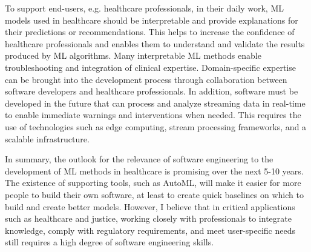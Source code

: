 \documentclass[11pt,runningheads]{article}
\begin{document}
To support end-users, e.g. healthcare professionals, in their daily work, ML models used in healthcare should be interpretable and provide explanations for their predictions or recommendations. 
This helps to increase the confidence of healthcare professionals and enables them to understand and validate the results produced by ML algorithms. Many interpretable ML methods enable troubleshooting and integration of clinical expertise. Domain-specific expertise can be brought into the development process through collaboration between software developers and healthcare professionals. 
In addition, software must be developed in the future that can process and analyze streaming data in real-time to enable immediate warnings and interventions when needed. This requires the use of technologies such as edge computing, stream processing frameworks, and a scalable infrastructure.

In summary, the outlook for the relevance of software engineering to the development of ML methods in healthcare is promising over the next 5-10 years. 
The existence of supporting tools, such as AutoML, will make it easier for more people to build their own software, at least to create quick baselines on which to build and
create better models. However, I believe that in critical applications such as healthcare and justice, working closely with professionals to integrate knowledge, comply with regulatory requirements, and meet user-specific needs still requires a high degree of software engineering skills. 

\newpage
\printbibliography
\end{document}
